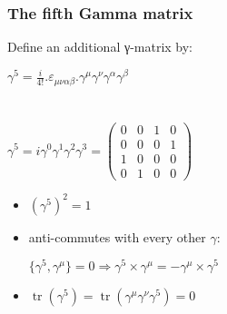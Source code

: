 \label{The fifth Gamma matrix}
\begin{frame}\frametitle{The fifth Gamma matrix}

Define an additional γ-matrix by:\\

\begin{center}
 $\gamma ^{5}={\frac {i}{4!}} . \varepsilon _{\mu \nu \alpha \beta }.\gamma ^{\mu }\gamma ^{\nu }\gamma ^{\alpha }\gamma ^{\beta }$
\\
\\
\\ 
$ \gamma ^{5}=i \gamma^{0} \gamma^{1} \gamma^{2} \gamma^{3} ={\begin{pmatrix}0&0&1&0\\0&0&0&1\\1&0&0&0\\0&1&0&0\end{pmatrix}}$

 
\end{center}


\begin{itemize}
 \item  $(\gamma^5)^2 = 1$
\item anti-commutes with every other $\gamma$:
\begin{center}
	$\{\gamma^5,\gamma^\mu\}=0 \Longrightarrow \gamma^5\times \gamma^\mu = - \gamma^\mu \times \gamma^5 $
\end{center}
 



\item
$\operatorname {tr} \left(\gamma ^{5}\right)=\operatorname {tr} \left(\gamma ^{\mu }\gamma ^{\nu }\gamma ^{5}\right)=0$
\end{itemize}

\end{frame}



\label{The fifth Gamma matrix}

